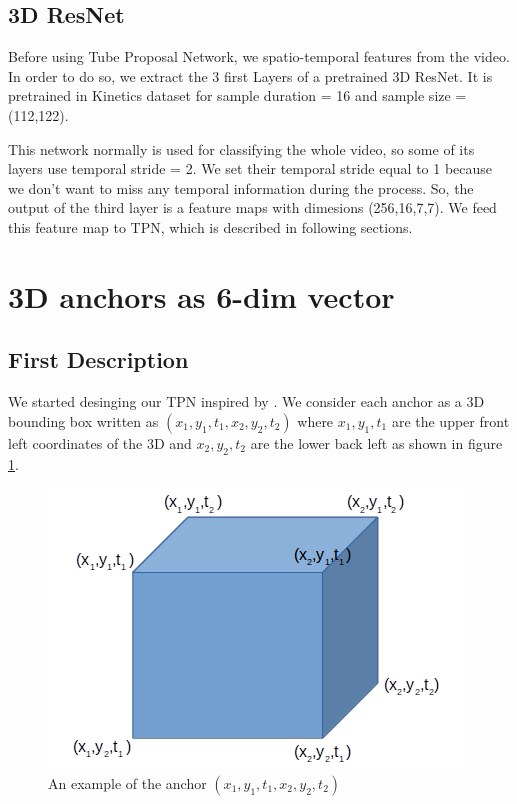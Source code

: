 \documentclass{report}
\begin{document}
\subsection{3D ResNet}
Before using Tube Proposal Network, we spatio-temporal features from the video. In order to do so, we extract the 3 first Layers of a
pretrained 3D ResNet. It is pretrained in Kinetics dataset \cite{DBLP:journals/corr/KayCSZHVVGBNSZ17} for sample duration = 16 and
sample size = (112,122). \par
This network normally is used for classifying the whole video, so some of its layers use temporal stride = 2.
We set their temporal stride equal to 1 because we don't want to miss any temporal information during the process.
So, the output of the third layer is a feature maps with dimesions (256,16,7,7). We feed this feature map to TPN, which is described
in following sections.

\section{ 3D anchors as 6-dim vector}
\subsection{First Description}
We started desinging our TPN inspired by \cite{DBLP:journals/corr/HouCS17}. We consider each anchor as a 3D bounding box written as
$(x_1, y_1, t_1, x_2, y_2, t_2)$ where $x_1, y_1, t_1$
are the upper front left coordinates of the 3D and $x_2, y_2, t_2$ are the lower back left as shown in figure \ref{fig:anchor_6d}.
\begin{figure}[h]
  \centering
  \includegraphics[scale=0.5]{anchor_6d}
  \caption{An example of the anchor $(x_1,y_1,t_1,x_2,y_2,t_2)$}
  \label{fig:anchor_6d}
\end{figure}
\end{document}
